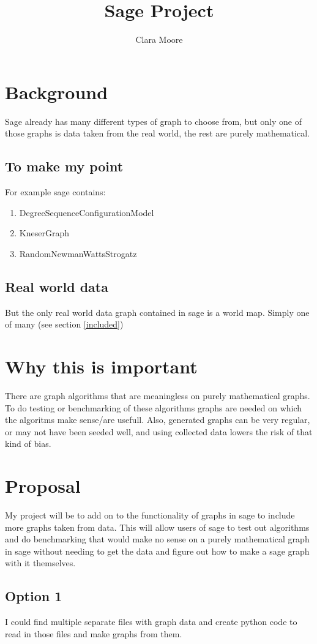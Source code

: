 \documentclass{article}
\title{Sage Project}
\author{Clara Moore}
\begin{document}
\maketitle

\section{Background}
Sage already has many different types of graph to choose from, but only one of those graphs is data taken from the real world, the rest are purely mathematical.
\label{included}\subsection{To make my point} \label{inc}
For example sage contains:
\begin{enumerate}
\item DegreeSequenceConfigurationModel
\item KneserGraph
\item RandomNewmanWattsStrogatz
\end{enumerate}
\subsection{Real world data}
But the only real world data graph contained in sage is a world map. Simply one of many (see section \ref{included})
\section{Why this is important}
There are graph algorithms that are meaningless on purely mathematical graphs. To do testing or benchmarking of these algorithms graphs are needed on which the algoritms make sense/are usefull. Also, generated graphs can be very regular, or may not have been seeded well, and using collected data lowers the risk of that kind of bias.
\section{Proposal}
My project will be to add on to the functionality of graphs in sage to include more graphs taken from data. This will allow users of sage to test out algorithms and do benchmarking that would make no sense on a purely mathematical graph in sage without needing to get the data and figure out how to make a sage graph with it themselves.
\subsection{Option 1}
I could find multiple separate files with graph data and create python code to read in those files and make graphs from them.
\end{document}
